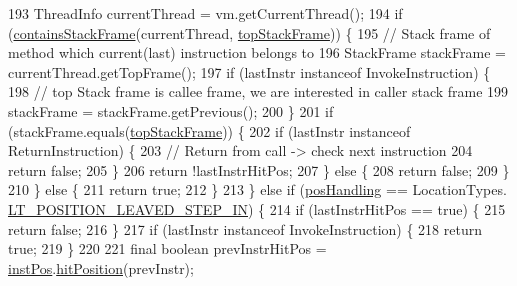 \begin{DoxyCode}
193       ThreadInfo currentThread = vm.getCurrentThread();
194       \textcolor{keywordflow}{if} (\hyperlink{classgov_1_1nasa_1_1jpf_1_1inspector_1_1server_1_1expression_1_1expressions_1_1_expression_breakpoint_single_step_ac0c08cf4675bb41a232734a11f79c974}{containsStackFrame}(currentThread, \hyperlink{classgov_1_1nasa_1_1jpf_1_1inspector_1_1server_1_1expression_1_1expressions_1_1_expression_breakpoint_single_step_afa7515e97496d50357b868ae93eb4023}{topStackFrame})) \{
195         \textcolor{comment}{// Stack frame of method which current(last) instruction belongs to}
196         StackFrame stackFrame = currentThread.getTopFrame();
197         \textcolor{keywordflow}{if} (lastInstr instanceof InvokeInstruction) \{
198           \textcolor{comment}{// top Stack frame is callee frame, we are interested in caller stack frame}
199           stackFrame = stackFrame.getPrevious();
200         \}
201         \textcolor{keywordflow}{if} (stackFrame.equals(\hyperlink{classgov_1_1nasa_1_1jpf_1_1inspector_1_1server_1_1expression_1_1expressions_1_1_expression_breakpoint_single_step_afa7515e97496d50357b868ae93eb4023}{topStackFrame})) \{
202           \textcolor{keywordflow}{if} (lastInstr instanceof ReturnInstruction) \{
203             \textcolor{comment}{// Return from call -> check next instruction}
204             \textcolor{keywordflow}{return} \textcolor{keyword}{false};
205           \}
206           \textcolor{keywordflow}{return} !lastInstrHitPos;
207         \} \textcolor{keywordflow}{else} \{
208           \textcolor{keywordflow}{return} \textcolor{keyword}{false};
209         \}
210       \} \textcolor{keywordflow}{else} \{
211         \textcolor{keywordflow}{return} \textcolor{keyword}{true};
212       \}
213     \} \textcolor{keywordflow}{else} \textcolor{keywordflow}{if} (\hyperlink{classgov_1_1nasa_1_1jpf_1_1inspector_1_1server_1_1expression_1_1expressions_1_1_expression_breakpoint_single_step_a5cee588755cfc9e8984512320b5cba4d}{posHandling} == LocationTypes.
      \hyperlink{enumgov_1_1nasa_1_1jpf_1_1inspector_1_1server_1_1expression_1_1expressions_1_1_expression_breakp227857a8c42509ddd72c386e68619da4_a6bd7cb0e72926134198a7eb26ae84c46}{LT\_POSITION\_LEAVED\_STEP\_IN}) \{
214       \textcolor{keywordflow}{if} (lastInstrHitPos == \textcolor{keyword}{true}) \{
215         \textcolor{keywordflow}{return} \textcolor{keyword}{false};
216       \}
217       \textcolor{keywordflow}{if} (lastInstr instanceof InvokeInstruction) \{
218         \textcolor{keywordflow}{return} \textcolor{keyword}{true};
219       \}
220 
221       \textcolor{keyword}{final} \textcolor{keywordtype}{boolean} prevInstrHitPos = \hyperlink{classgov_1_1nasa_1_1jpf_1_1inspector_1_1server_1_1expression_1_1expressions_1_1_expression_breakpoint_single_step_a72c10f41814ab478d923986e7c06b0da}{instPos}.\hyperlink{interfacegov_1_1nasa_1_1jpf_1_1inspector_1_1interfaces_1_1_instruction_position_a74e0a143b5cc51a5b147f2f2a2709638}{hitPosition}(prevInstr);

\end{DoxyCode}
